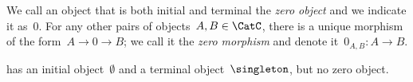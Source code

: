 \begin{comment}
  \begin{table}[b]
    \resizebox{\textwidth}{!}{
      \begin{tabular}{ccccccccccc}
        category &
        objects & morphisms &
        product (ob) & product (morph) & coproduct (ob) & coproduct (morph)
        & biproduct (morph)
        & tensor product
        &
        initial
        & terminal
        \\
        \hline

        \Set &
        sets & functions &
        Cartesian product & (not used) & disjoint union & (not used) &
        none
        & $\times$ \emph{or} $\sqcup$
        &
        $\emptyset$
        & $\{\ast\}$
        \\

        $\Cat{Pos}$ &
        posets & monotone maps &
        Cartesian product & (not used) & disjoint union & (not used)
        &
        none
        & $\times$
        &
        $\emptyset$
        & $\{\ast\}$
        \\

        \DP &
        posets & design problems &
        disjoint union & $\times_\DP$ & disjoint union & $\sqcup_\DP$
        &
        disjoint union
        & $\times$
        &
        $\emptyset$
        & $\{\ast\}$
        \\

      \end{tabular}}
    \caption{A comparison of $\Pos, \Set$, and \DP.}
  \end{table}
\end{comment}

\begin{ctdefinition}
  We call an object that is both initial and terminal the \emph{zero object} and we indicate it as~$0$. For any other pairs of objects~$A, B\in\CatC$, there is a unique morphism of the form~$A \to 0\to B$; we call it the \emph{zero morphism} and denote it~$0_{A,B}\colon A \to B$.
\end{ctdefinition}

\begin{example}
  \Pos has an initial object~$\emptyset$ and a terminal object~$\singleton$, but no zero object.
\end{example}

